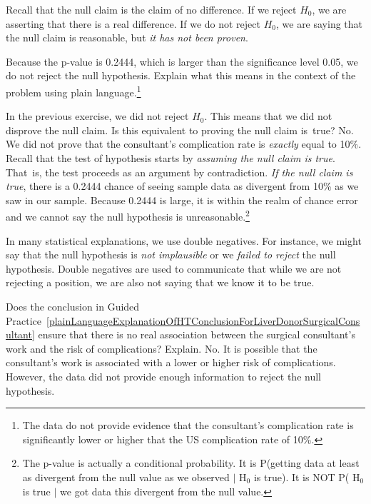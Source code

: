 Recall that the null claim is the claim of no difference. If we reject $H_0$, we are asserting that there is a real difference. If we do not reject $H_0$, we are saying that the null claim is reasonable, but \emph{it has not been proven}.

\begin{exercise} \label{plainLanguageExplanationOfHTConclusionForLiverDonorSurgicalConsultant}
Because the p-value is 0.2444, which is larger than the significance level 0.05, we do not reject the null hypothesis. Explain what this means in the context of the problem using plain language.\footnote{The data do not provide evidence that the consultant's complication rate is significantly lower or higher that the US complication rate of 10\%.}
\end{exercise}

\begin{example}{In the previous exercise, we did not reject $H_0$. This means that we did not disprove the null claim. Is this equivalent to proving the null claim is~true?}
No. We did not prove that the consultant's complication rate is \emph{exactly} equal to 10\%. Recall that the test of hypothesis starts by \emph{assuming the null claim is true}. That~is, the test proceeds as an argument by contradiction. \emph{If the null claim is true}, there is a 0.2444 chance of seeing sample data as divergent from 10\% as we saw in our sample. Because 0.2444 is large, it is within the realm of chance error and we cannot say the null hypothesis is unreasonable.\footnote{The p-value is actually a conditional probability. It is P(getting data at least as divergent from the null value as we observed $|$ H$_0$ is true). It is NOT P( H$_0$ is true $|$ we got data this divergent from the null value.}
\end{example}


\begin{tipBox}{
In many statistical explanations, we use double negatives. For instance, we might say that the null hypothesis is \emph{not implausible} or we \emph{failed to reject} the null hypothesis. Double negatives are used to communicate that while we are not rejecting a position, we are also not saying that we know it to be true.}
\end{tipBox}

\begin{example}{Does the conclusion in Guided Practice~\ref{plainLanguageExplanationOfHTConclusionForLiverDonorSurgicalConsultant} ensure that there is no real association between the surgical consultant's work and the risk of complications? Explain.}
No. It is possible that the consultant's work is associated with a lower or higher risk of complications. However, the data did not provide enough information to reject the null hypothesis.
\end{example}

